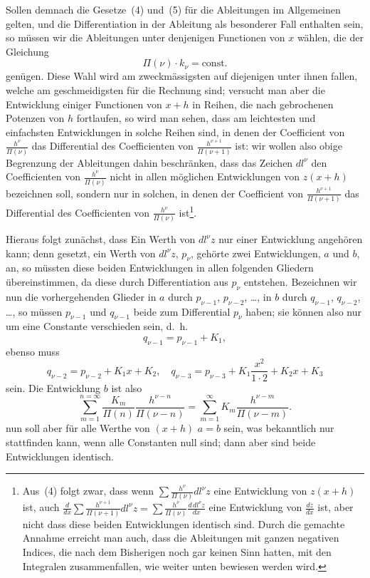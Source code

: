 \documentclass[12pt,a4paper]{article}
\begin{document}
Sollen demnach die Gesetze~(4) und~(5) f\"ur die Ableitungen im Allgemeinen gelten, und die Differentiation in der Ableitung als besonderer Fall enthalten sein, so m\"ussen wir die Ableitungen unter denjenigen Functionen von $x$ w\"ahlen, die der Gleichung
\[
\Pi(\nu) \cdot k_\nu = \text{const.}
\]
gen\"ugen. Diese Wahl wird am zweckm\"assigsten auf diejenigen unter ihnen fallen, welche am geschmeidigsten f\"ur die Rechnung sind; versucht man aber die Entwicklung einiger Functionen von $x+h$ in Reihen, die nach gebrochenen Potenzen von $h$ fortlaufen, so wird man sehen, dass am leichtesten und einfachsten Entwicklungen in solche Reihen sind, in denen der Coefficient von $\frac{h^\nu}{\Pi(\nu)}$ das Differential des Coefficienten von $\frac{h^{\nu+1}}{\Pi(\nu+1)}$ ist: wir wollen also obige Begrenzung der Ableitungen dahin beschr\"anken, dass das Zeichen $dl^\nu$ den Coefficienten von $\frac{h^\nu}{\Pi(\nu)}$ nicht in allen m\"oglichen Entwicklungen von $z(x+h)$ bezeichnen soll, sondern nur in solchen, in denen der Coefficient von $\frac{h^{\nu+1}}{\Pi(\nu+1)}$ das Differential des Coefficienten von $\frac{h^\nu}{\Pi(\nu)}$ ist\footnote{Aus~(4) folgt zwar, dass wenn $\sum \frac{h^\nu}{\Pi(\nu)} dl^\nu z$ eine Entwicklung von $z(x+h)$ ist, auch $\frac{d}{dx} \sum \frac{h^{\nu+1}}{\Pi(\nu+1)} dl^\nu z = \sum \frac{h^\nu}{\Pi(\nu)} \frac{d\,dl^\nu z}{dx}$ eine Entwicklung von $\frac{dz}{dx}$ ist, aber nicht dass diese beiden Entwicklungen identisch sind. Durch die gemachte Annahme erreicht man auch, dass die Ableitungen mit ganzen negativen Indices, die nach dem Bisherigen noch gar keinen Sinn hatten, mit den Integralen zusammenfallen, wie weiter unten bewiesen werden wird.}.

\newpage

Hieraus folgt zun\"achst, dass Ein Werth von $dl^\nu z$ nur einer Entwicklung angeh\"oren kann; denn gesetzt, ein Werth von $dl^\nu z$, $p_\nu$, geh\"orte zwei Entwicklungen, $a$ und $b$, an, so m\"ussten diese beiden Entwicklungen in allen folgenden Gliedern \"ubereinstimmen, da diese durch Differentiation aus $p_\nu$ entstehen. Bezeichnen wir nun die vorhergehenden Glieder in $a$ durch $p_{\nu-1}$, $p_{\nu-2}$, \ldots, in $b$ durch $q_{\nu-1}$, $q_{\nu-2}$, \ldots, so m\"ussen $p_{\nu-1}$ und $q_{\nu-1}$ beide zum Differential $p_\nu$ haben; sie k\"onnen also nur um eine Constante verschieden sein, d.\ h.
\[
q_{\nu-1} = p_{\nu-1} + K_1,
\]
ebenso muss
\[
q_{\nu-2} = p_{\nu-2} + K_1 x + K_2, \quad q_{\nu-3} = p_{\nu-3} + K_1 \frac{x^2}{1 \cdot 2} + K_2 x + K_3
\]
sein. Die Entwicklung $b$ ist also
\[
\sum_{m=1}^{n=\infty} \frac{K_m}{\Pi(n)} \frac{h^{\nu-n}}{\Pi(\nu-n)} = \sum_{m=1}^{\infty} K_m \frac{h^{\nu-m}}{\Pi(\nu-m)}.
\]
nun soll aber f\"ur alle Werthe von $(x+h)$ $a=b$ sein, was bekanntlich nur stattfinden kann, wenn alle Constanten null sind; dann aber sind beide Entwicklungen identisch.
\end{document}
